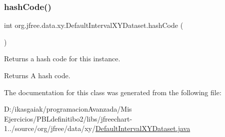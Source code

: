 \subsubsection{\texorpdfstring{hash\+Code()}{hashCode()}}
{\footnotesize\ttfamily int org.\+jfree.\+data.\+xy.\+Default\+Interval\+X\+Y\+Dataset.\+hash\+Code (\begin{DoxyParamCaption}{ }\end{DoxyParamCaption})}

Returns a hash code for this instance.

\begin{DoxyReturn}{Returns}
A hash code. 
\end{DoxyReturn}


The documentation for this class was generated from the following file\+:\begin{DoxyCompactItemize}
\item 
D\+:/ikasgaiak/programacion\+Avanzada/\+Mis Ejercicios/\+P\+B\+Ldefinitibo2/libs/jfreechart-\/1../source/org/jfree/data/xy/\mbox{\hyperlink{_default_interval_x_y_dataset_8java}{Default\+Interval\+X\+Y\+Dataset.\+java}}\end{DoxyCompactItemize}
